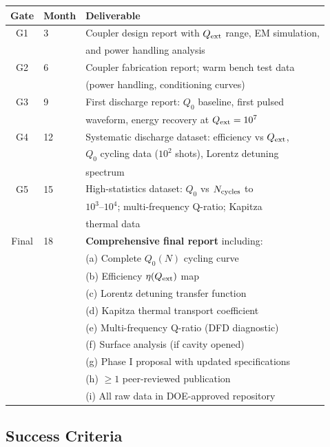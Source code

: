 \documentclass[11pt]{article}
\newcommand{\Qext}{Q_{\rm ext}}
\newcommand{\Qzero}{Q_0}
\begin{document}
\begin{center}
\small
\begin{tabular}{cll}
\toprule
Gate & Month & Deliverable \\
\midrule
G1 & 3 & Coupler design report with $\Qext$ range, EM simulation, \\
   & & and power handling analysis \\
G2 & 6 & Coupler fabrication report; warm bench test data \\
   & & (power handling, conditioning curves) \\
G3 & 9 & First discharge report: $\Qzero$ baseline, first pulsed \\
   & & waveform, energy recovery at $\Qext = 10^7$ \\
G4 & 12 & Systematic discharge dataset: efficiency vs $\Qext$, \\
   & & $\Qzero$ cycling data ($10^2$ shots), Lorentz detuning \\
   & & spectrum \\
G5 & 15 & High-statistics dataset: $\Qzero$ vs $N_{\rm cycles}$ to \\
   & & $10^3$--$10^4$; multi-frequency Q-ratio; Kapitza \\
   & & thermal data \\
\midrule
Final & 18 & \textbf{Comprehensive final report} including: \\
      & & \quad (a) Complete $\Qzero(N)$ cycling curve \\
      & & \quad (b) Efficiency $\eta(\Qext)$ map \\
      & & \quad (c) Lorentz detuning transfer function \\
      & & \quad (d) Kapitza thermal transport coefficient \\
      & & \quad (e) Multi-frequency Q-ratio (DFD diagnostic) \\
      & & \quad (f) Surface analysis (if cavity opened) \\
      & & \quad (g) Phase I proposal with updated specifications \\
      & & \quad (h) $\geq 1$ peer-reviewed publication \\
      & & \quad (i) All raw data in DOE-approved repository \\
\bottomrule
\end{tabular}
\end{center}

\subsection{Success Criteria}
\end{document}
